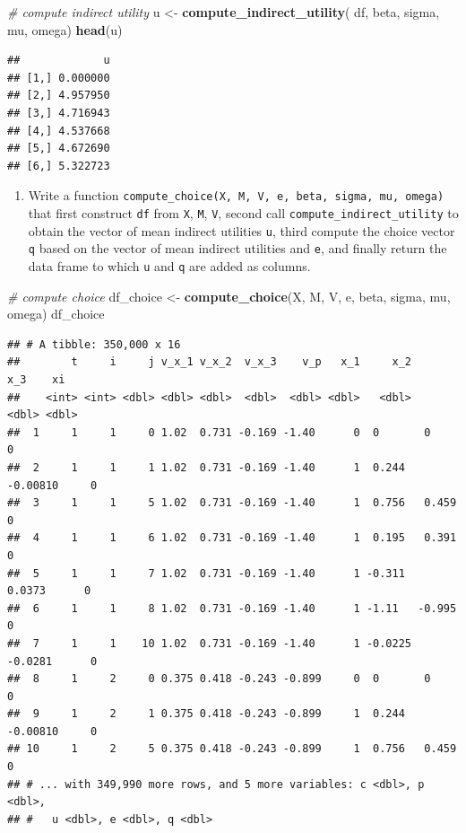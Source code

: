 \documentclass[]{book}
\newenvironment{Shaded}{\begin{snugshade}}{\end{snugshade}}
\newcommand{\KeywordTok}[1]{\textcolor[rgb]{0.13,0.29,0.53}{\textbf{#1}}}
\newcommand{\StringTok}[1]{\textcolor[rgb]{0.31,0.60,0.02}{#1}}
\newcommand{\CommentTok}[1]{\textcolor[rgb]{0.56,0.35,0.01}{\textit{#1}}}
\newcommand{\NormalTok}[1]{#1}
\providecommand{\tightlist}{%
  \setlength{\itemsep}{0pt}\setlength{\parskip}{0pt}}
\begin{document}
\begin{Shaded}
\begin{Highlighting}[]
\CommentTok{# compute indirect utility}
\NormalTok{u <-}\StringTok{ }
\StringTok{  }\KeywordTok{compute_indirect_utility}\NormalTok{(}
\NormalTok{    df, beta, sigma, }
\NormalTok{           mu, omega)}
\KeywordTok{head}\NormalTok{(u)}
\end{Highlighting}
\end{Shaded}

\begin{verbatim}
##             u
## [1,] 0.000000
## [2,] 4.957950
## [3,] 4.716943
## [4,] 4.537668
## [5,] 4.672690
## [6,] 5.322723
\end{verbatim}

\begin{enumerate}
\def\labelenumi{\arabic{enumi}.}
\setcounter{enumi}{7}
\tightlist
\item
  Write a function
  \texttt{compute\_choice(X,\ M,\ V,\ e,\ beta,\ sigma,\ mu,\ omega)}
  that first construct \texttt{df} from \texttt{X}, \texttt{M},
  \texttt{V}, second call \texttt{compute\_indirect\_utility} to obtain
  the vector of mean indirect utilities \texttt{u}, third compute the
  choice vector \texttt{q} based on the vector of mean indirect
  utilities and \texttt{e}, and finally return the data frame to which
  \texttt{u} and \texttt{q} are added as columns.
\end{enumerate}

\begin{Shaded}
\begin{Highlighting}[]
\CommentTok{# compute choice}
\NormalTok{df_choice <-}\StringTok{ }
\StringTok{  }\KeywordTok{compute_choice}\NormalTok{(X, M, V, e, beta, sigma, }
\NormalTok{                 mu, omega)}
\NormalTok{df_choice}
\end{Highlighting}
\end{Shaded}

\begin{verbatim}
## # A tibble: 350,000 x 16
##        t     i     j v_x_1 v_x_2  v_x_3    v_p   x_1     x_2      x_3    xi
##    <int> <int> <dbl> <dbl> <dbl>  <dbl>  <dbl> <dbl>   <dbl>    <dbl> <dbl>
##  1     1     1     0 1.02  0.731 -0.169 -1.40      0  0       0           0
##  2     1     1     1 1.02  0.731 -0.169 -1.40      1  0.244  -0.00810     0
##  3     1     1     5 1.02  0.731 -0.169 -1.40      1  0.756   0.459       0
##  4     1     1     6 1.02  0.731 -0.169 -1.40      1  0.195   0.391       0
##  5     1     1     7 1.02  0.731 -0.169 -1.40      1 -0.311   0.0373      0
##  6     1     1     8 1.02  0.731 -0.169 -1.40      1 -1.11   -0.995       0
##  7     1     1    10 1.02  0.731 -0.169 -1.40      1 -0.0225 -0.0281      0
##  8     1     2     0 0.375 0.418 -0.243 -0.899     0  0       0           0
##  9     1     2     1 0.375 0.418 -0.243 -0.899     1  0.244  -0.00810     0
## 10     1     2     5 0.375 0.418 -0.243 -0.899     1  0.756   0.459       0
## # ... with 349,990 more rows, and 5 more variables: c <dbl>, p <dbl>,
## #   u <dbl>, e <dbl>, q <dbl>
\end{verbatim}
\end{document}

